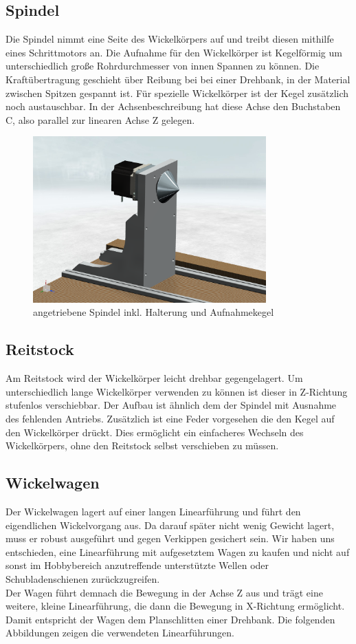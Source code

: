 \documentclass[paper=A4,pagesize,DIV=18, 12pt,listof=totoc,bibliography=totoc,headings=optiontohead,open=any]{article}
\begin{document}
\subsection{Spindel}
Die Spindel nimmt eine Seite des Wickelkörpers auf und treibt diesen mithilfe eines Schrittmotors an. Die Aufnahme für den Wickelkörper ist Kegelförmig um unterschiedlich große Rohrdurchmesser von innen Spannen zu können. Die Kraftübertragung geschieht über Reibung bei bei einer Drehbank, in der Material zwischen Spitzen gespannt ist. Für spezielle Wickelkörper ist der Kegel zusätzlich noch austauschbar. In der Achsenbeschreibung hat diese Achse den Buchstaben C, also parallel zur linearen Achse Z gelegen.

\begin{figure}[H]
	\centering
	\includegraphics[width=0.8\textwidth]{NX_Screenshots/spindel.png}
	\caption{angetriebene Spindel inkl. Halterung und Aufnahmekegel} 
	\label{fig:spindel}
\end{figure}

\subsection{Reitstock}
Am Reitstock wird der Wickelkörper leicht drehbar gegengelagert. Um unterschiedlich lange Wickelkörper verwenden zu können ist dieser in Z-Richtung stufenlos verschiebbar. Der Aufbau ist ähnlich dem der Spindel mit Ausnahme des fehlenden Antriebs. Zusätzlich ist eine Feder vorgesehen die den Kegel auf den Wickelkörper drückt. Dies ermöglicht ein einfacheres Wechseln des Wickelkörpers, ohne den Reitstock selbst verschieben zu müssen.


\subsection{Wickelwagen}
Der Wickelwagen lagert auf einer langen Linearführung und führt den eigendlichen Wickelvorgang aus. Da darauf später nicht wenig Gewicht lagert, muss er robust ausgeführt und gegen Verkippen gesichert sein. Wir haben uns entschieden, eine Linearführung mit aufgesetztem Wagen zu kaufen und nicht auf sonst im Hobbybereich anzutreffende unterstützte Wellen oder Schubladenschienen zurückzugreifen.\\
Der Wagen führt demnach die Bewegung in der Achse Z aus und trägt eine weitere, kleine Linearführung, die dann die Bewegung in X-Richtung ermöglicht. Damit entspricht der Wagen dem Planschlitten einer Drehbank. Die folgenden Abbildungen zeigen die verwendeten Linearführungen.
\end{document}
